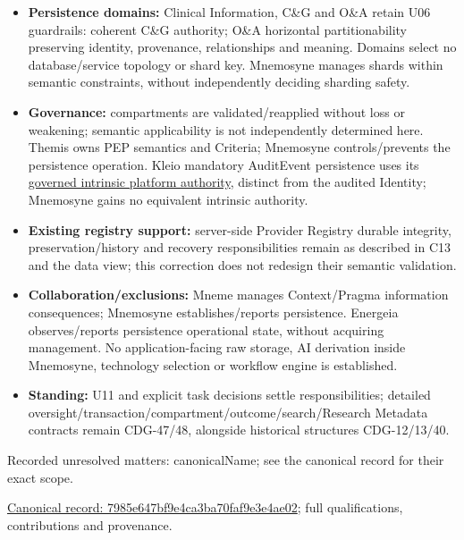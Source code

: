 \begin{itemize}
\item \textbf{Persistence domains:} Clinical Information, C\&G and O\&A retain U06 guardrails:
  coherent C\&G authority; O\&A horizontal partitionability preserving identity,
  provenance, relationships and meaning. Domains select no database/service topology
  or shard key. Mnemosyne manages shards within semantic constraints, without
  independently deciding sharding safety.

\item \textbf{Governance:} compartments are validated/reapplied without loss or weakening;
  semantic applicability is not independently determined here. Themis owns PEP
  semantics and Criteria; Mnemosyne controls/prevents the persistence operation.
  Kleio mandatory AuditEvent persistence uses its
  \href{\detokenize{../../../../../docs/markdown/05-information-systems-architecture/component-register.md#kleio-capture-authority}}{governed intrinsic platform authority}, distinct
  from the audited Identity; Mnemosyne gains no equivalent intrinsic authority.

\item \textbf{Existing registry support:} server-side Provider Registry durable integrity,
  preservation/history and recovery responsibilities remain as described in C13
  and the data view; this correction does not redesign their semantic validation.

\item \textbf{Collaboration/exclusions:} Mneme manages Context/Pragma information consequences;
  Mnemosyne establishes/reports persistence. Energeia observes/reports persistence
  operational state, without acquiring management. No application-facing raw storage,
  AI derivation inside Mnemosyne, technology selection or workflow engine is established.

\item \textbf{Standing:} U11 and explicit task decisions settle responsibilities; detailed
  oversight/transaction/compartment/outcome/search/Research Metadata contracts remain
  CDG-47/48, alongside historical structures CDG-12/13/40.

\end{itemize}

{\small Recorded unresolved matters: canonicalName; see the canonical record for their exact scope.}\par
{\footnotesize \href{../../../../continuum/application/application-component/7985e647bf9e4ca3ba70faf9e3e4ae02.md}{Canonical record: 7985e647bf9e4ca3ba70faf9e3e4ae02}; full qualifications, contributions and provenance.}\par
